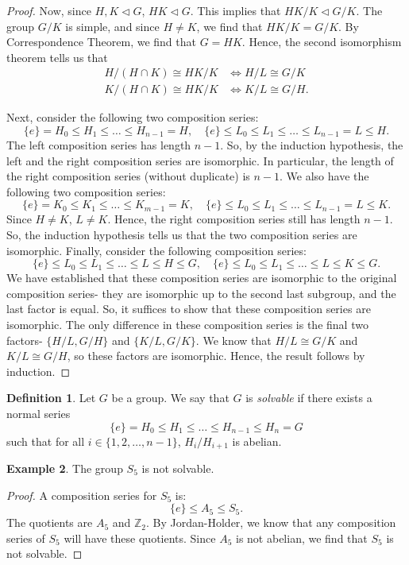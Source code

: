 \documentclass[a4paper, openany]{memoir}
\theoremstyle{definition}
\newtheorem{definition}{Definition}[section]
\newtheorem{example}[definition]{Example}
\theoremstyle{plain}
\begin{document}
\begin{proof}
        Now, since $H, K \vartriangleleft G$, $HK \vartriangleleft G$. This implies that $HK/K \vartriangleleft G/K$. The group $G/K$ is simple, and since $H \neq K$, we find that $HK/K = G/K$. By Correspondence Theorem, we find that $G = HK$. Hence, the second isomorphism theorem tells us that
        \begin{align*}
            H/(H \cap K) \cong HK/K &\iff H/L \cong G/K \\
            K/(H \cap K) \cong HK/K &\iff K/L \cong G/H.
        \end{align*}
        
        Next, consider the following two composition series:
        \[\{e\} = H_0 \leq H_1 \leq \dots \leq H_{n-1} = H, \quad \{e\} \leq L_0 \leq L_1 \leq \dots \leq L_{n-1} = L \leq H.\]
        The left composition series has length $n-1$. So, by the induction hypothesis, the left and the right composition series are isomorphic. In particular, the length of the right composition series (without duplicate) is $n-1$. We also have the following two composition series:
        \[\{e\} = K_0 \leq K_1 \leq \dots \leq K_{m-1} = K, \quad \{e\} \leq L_0 \leq L_1 \leq \dots \leq L_{n-1} = L \leq K.\]
        Since $H \neq K$, $L \neq K$. Hence, the right composition series still has length $n-1$. So, the induction hypothesis tells us that the two composition series are isomorphic. Finally, consider the following composition series:
        \[\{e\} \leq L_0 \leq L_1 \leq \dots \leq L \leq H \leq G, \quad \{e\} \leq L_0 \leq L_1 \leq \dots \leq L \leq K \leq G.\]
        We have established that these composition series are isomorphic to the original composition series- they are isomorphic up to the second last subgroup, and the last factor is equal. So, it suffices to show that these composition series are isomorphic. The only difference in these composition series is the final two factors- $\{H/L, G/H\}$ and $\{K/L, G/K\}$. We know that $H/L \cong G/K$ and $K/L \cong G/H$, so these factors are isomorphic. Hence, the result follows by induction.
    \end{proof}

    \begin{definition}
        Let $G$ be a group. We say that $G$ is \emph{solvable} if there exists a normal series
        \[\{e\} = H_0 \leq H_1 \leq \dots \leq H_{n-1} \leq H_n = G\]
        such that for all $i \in \{1, 2, \dots, n-1\}$, $H_i/H_{i+1}$ is abelian.
    \end{definition}

    \begin{example}
        The group $S_5$ is not solvable.
    \end{example}
    \begin{proof}
        A composition series for $S_5$ is:
        \[\{e\} \leq A_5 \leq S_5.\]
        The quotients are $A_5$ and $\mathbb{Z}_2$. By Jordan-Holder, we know that any composition series of $S_5$ will have these quotients. Since $A_5$ is not abelian, we find that $S_5$ is not solvable.
    \end{proof}
\end{document}
